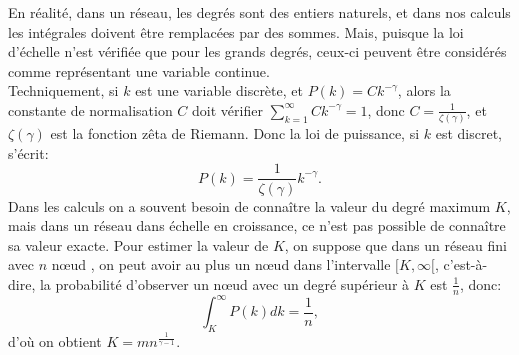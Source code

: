 En réalité, dans un réseau, les degrés sont des entiers naturels, et dans nos calculs les intégrales doivent être remplacées par des sommes. Mais, puisque la loi d'échelle
n'est vérifiée que pour les grands degrés, ceux-ci peuvent être considérés comme représentant  une variable continue.\\
Techniquement, si $k$ est une variable discrète, et $P(k)=Ck^{-\gamma}$, alors la constante de normalisation $C$ doit vérifier $\sum_{k=1}^{\infty}Ck^{-\gamma}=1$, donc $C=\frac{1}{\zeta(\gamma)}$, et $\zeta(\gamma)$ est la fonction zêta de Riemann. Donc la loi de puissance, si $k$ est discret, s'écrit:
\begin{equation}
P(k)=\frac{1}{\zeta(\gamma)}k^{-\gamma}.
\label{pk-descret}
\end{equation}
Dans les calculs on a souvent besoin de connaître la valeur du degré maximum $K$, mais dans un réseau dans échelle en croissance, ce n'est pas possible de connaître sa valeur exacte. Pour estimer la valeur de $K$, on suppose que dans un réseau fini avec $n$ nœud , on peut avoir au plus un nœud dans l'intervalle $[K,\infty[$, c'est-à-dire, la probabilité d'observer un nœud avec un degré supérieur à $K$ est $\frac{1}{n}$, donc:
\begin{equation}
\int_{K}^{\infty}P(k)dk=\frac{1}{n},
\end{equation}
d'où on obtient $K= mn^{\frac{1}{\gamma-1}}$.
